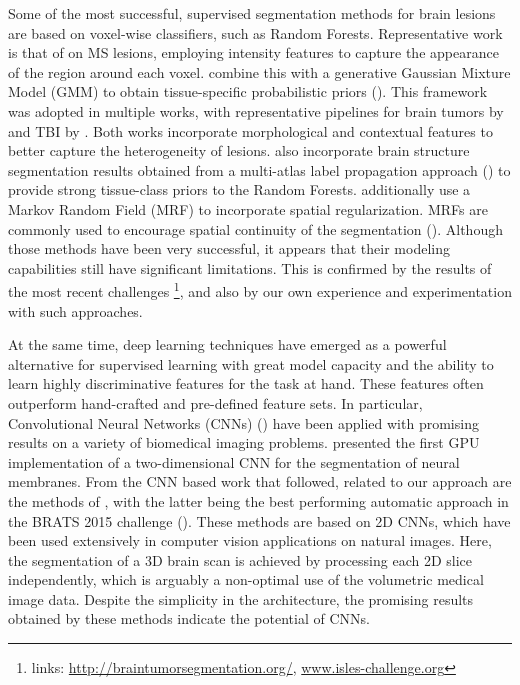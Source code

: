 \documentclass[preprint,authoryear,12pt]{elsarticle}
\begin{document}
Some of the most successful, supervised segmentation methods for brain lesions are based on voxel-wise classifiers, such as Random Forests. Representative work is that of \cite{Geremia2010} on MS lesions, employing intensity features to capture the appearance of the region around each voxel. \cite{Zikic2012} combine this with a generative Gaussian Mixture Model (GMM) to obtain tissue-specific probabilistic priors (\cite{Leemput1999}). This framework was adopted in multiple works, with representative pipelines for brain tumors by \cite{tustison2013Brats} and TBI by \cite{Rao2014b}. Both works incorporate morphological and contextual features to better capture the heterogeneity of lesions. \cite{Rao2014b} also incorporate brain structure segmentation results obtained from a multi-atlas label propagation approach (\cite{Ledig2015}) to provide strong tissue-class priors to the Random Forests. \cite{tustison2013Brats} additionally use a Markov Random Field (MRF) to incorporate spatial regularization. MRFs are commonly used to encourage spatial continuity of the segmentation (\cite{Schmidt2012, Mitra2014}). Although those methods have been very successful, it appears that their modeling capabilities still have significant limitations. This is confirmed by the results of the most recent challenges \footnote{links: \href{http://braintumorsegmentation.org/}{http://braintumorsegmentation.org/}, \href{www.isles-challenge.org}{www.isles-challenge.org}}, and also by our own experience and experimentation with such approaches.  

At the same time, deep learning techniques have emerged as a powerful alternative for supervised learning with great model capacity and the ability to learn highly discriminative features for the task at hand. These features often outperform hand-crafted and pre-defined feature sets. In particular, Convolutional Neural Networks (CNNs) (\cite{LeCun1998, Krizhevsky2012}) have been applied with promising results on a variety of biomedical imaging problems. \cite{Ciresan2012} presented the first GPU implementation of a two-dimensional CNN for the segmentation of neural membranes. From the CNN based work that followed, related to our approach are the methods of \cite{zikic2014CnnBrats, Havei2015Journal, pereira2015Brats}, with the latter being the best performing automatic approach in the BRATS 2015 challenge (\cite{Menze2014}). These methods are based on 2D CNNs, which have been used extensively in computer vision applications on natural images. Here, the segmentation of a 3D brain scan is achieved by processing each 2D slice independently, which is arguably a non-optimal use of the volumetric medical image data. Despite the simplicity in the architecture, the promising results obtained by these methods indicate the potential of CNNs.
\end{document}
